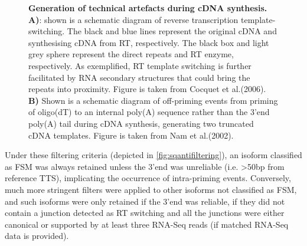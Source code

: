 \begin{figure}[h]
	{\textbf{Generation of technical artefacts during cDNA synthesis. A)}: shown is a schematic diagram of reverse transcription template-switching. The black and blue lines represent the original cDNA and synthesising cDNA from RT, respectively. The black box and light grey sphere represent the direct repeats and RT enzyme, respectively. As exemplified, RT template switching is further facilitated by RNA secondary structures that could bring the repeats into proximity\cite{Cocquet2006}. Figure is taken from Cocquet et al.(2006)\cite{Cocquet2006}. \textbf{B)} Shown is a schematic diagram of off-priming events from priming of oligo(dT) to an internal poly(A) sequence rather than the 3'end poly(A) tail during cDNA synthesis, generating two truncated cDNA templates. Figure is taken from Nam et al.(2002)\cite{Nam2002}. }
	\label{fig:lib_prep_artifacts}
\end{figure}

Under these filtering criteria (depicted in \cref{fig:sqantifiltering}), an isoform classified as FSM was always retained unless the 3'end was unreliable (i.e. >50bp from reference TTS), implicating the occurrence of intra-priming events. Conversely, much more stringent filters were applied to other isoforms not classified as FSM, and such isoforms were only retained if the 3'end was reliable, if they did not contain a junction detected as RT switching and all the junctions were either canonical or supported by at least three RNA-Seq reads (if matched RNA-Seq data is provided).   

